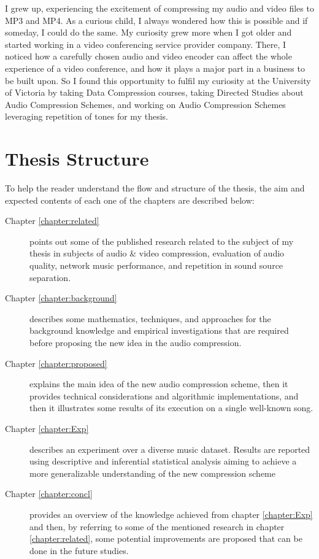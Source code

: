 I grew up, experiencing the excitement of compressing my audio and video files to MP3 and MP4. As a curious child, I always wondered how this is possible and if someday, I could do the same. My curiosity grew more when I got older and started working in a video conferencing service provider company. There, I noticed how a carefully chosen audio and video encoder can affect the whole experience of a video conference, and how it plays a major part in a business to be built upon. So I found this opportunity to fulfil my curiosity at the University of Victoria by taking Data Compression courses, taking Directed Studies about Audio Compression Schemes, and working on Audio Compression Schemes leveraging repetition of tones for my thesis.

\section{Thesis Structure}
To help the reader understand the flow and structure of the thesis, the aim and expected contents of each one of the chapters are described below:

\begin{description}
\item[Chapter \ref{chapter:related}] points out some of the published research related to the subject of my thesis in subjects of audio \& video compression, evaluation of audio quality, network music performance, and repetition in sound source separation.
\item[Chapter \ref{chapter:background}] describes some mathematics, techniques, and approaches for the background knowledge and empirical investigations that are required before proposing the new idea in the audio compression.
\item[Chapter \ref{chapter:proposed}] explains the main idea of the new audio compression scheme, then it provides technical considerations and algorithmic implementations, and then it illustrates some results of its execution on a single well-known song.
\item[Chapter \ref{chapter:Exp}] describes an experiment over a diverse music dataset. Results are reported using descriptive and inferential statistical analysis aiming to achieve a more generalizable understanding of the new compression scheme
\item[Chapter \ref{chapter:concl}] provides an overview of the knowledge achieved from chapter \ref{chapter:Exp} and then, by referring to some of the mentioned research in chapter \ref{chapter:related}, some potential improvements are proposed that can be done in the future studies.
\end{description}